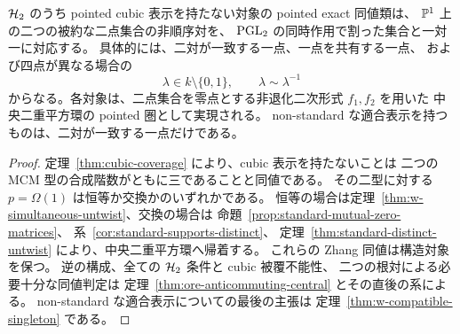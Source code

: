 \begin{theorem}
\label{thm:noncubic-classification}
$\mathcal H_2$ のうち pointed cubic 表示を持たない対象の pointed exact 同値類は、
$\mathbb P^1$ 上の二つの被約な二点集合の非順序対を、
$\operatorname{PGL}_2$ の同時作用で割った集合と一対一に対応する。
具体的には、二対が一致する一点、一点を共有する一点、
および四点が異なる場合の
\[
 \lambda\in k\setminus\{0,1\},\qquad \lambda\sim\lambda^{-1}
\]
からなる。各対象は、二点集合を零点とする非退化二次形式 $f_1,f_2$ を用いた
中央二重平方環の pointed 圏として実現される。
non-standard な適合表示を持つものは、二対が一致する一点だけである。
\end{theorem}
\begin{proof}
定理~\ref{thm:cubic-coverage} により、cubic 表示を持たないことは
二つの MCM 型の合成階数がともに三であることと同値である。
その二型に対する $p=\Omega(1)$ は恒等か交換かのいずれかである。
恒等の場合は定理~\ref{thm:w-simultaneous-untwist}、交換の場合は
命題~\ref{prop:standard-mutual-zero-matrices}、
系~\ref{cor:standard-supports-distinct}、
定理~\ref{thm:standard-distinct-untwist} により、中央二重平方環へ帰着する。
これらの Zhang 同値は構造対象を保つ。
逆の構成、全ての $\mathcal H_2$ 条件と cubic 被覆不能性、
二つの根対による必要十分な同値判定は
定理~\ref{thm:ore-anticommuting-central} とその直後の系による。
non-standard な適合表示についての最後の主張は
定理~\ref{thm:w-compatible-singleton} である。
\end{proof}
